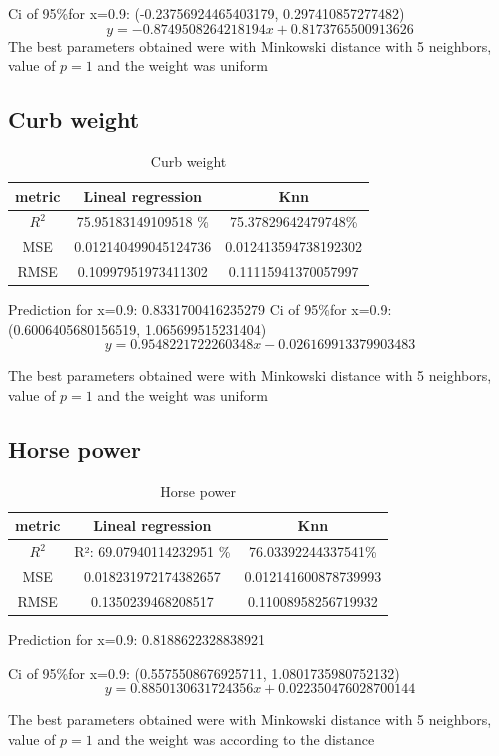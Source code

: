 \documentclass{article}
\begin{document}
Ci of  95\%for x=0.9: (-0.23756924465403179, 0.297410857277482)
$$y=-0.8749508264218194x+0.8173765500913626$$
The best parameters obtained were with Minkowski distance with 5 neighbors,  value of $p=1$ and the weight was uniform
\subsection{Curb weight}
\begin{table}[H]
\begin{tabular}{|c|c|c|}
  \hline
   metric & Lineal regression & Knn \\ \hline
   $R^2$& 75.95183149109518 \%&75.37829642479748\%\\
   MSE&  0.012140499045124736& 0.012413594738192302\\
   RMSE&0.10997951973411302
   &0.11115941370057997\\
   \hline
  \end{tabular}
  \caption{ Curb weight}
\end{table}
Prediction for x=0.9: 0.8331700416235279
Ci of  95\%for x=0.9: (0.6006405680156519, 1.065699515231404)
$$y=0.9548221722260348x -0.026169913379903483$$

The best parameters obtained were with Minkowski distance with 5 neighbors,  value of $p=1$ and the weight was uniform
\begin{table}[H]
\subsection{Horse power}
\begin{tabular}{|c|c|c|}
  \hline
   metric & Lineal regression & Knn \\ \hline
   $R^2$& R²: 69.07940114232951 \%&76.03392244337541\%\\
   MSE&  0.018231972174382657& 0.012141600878739993\\
   RMSE&0.1350239468208517& 0.11008958256719932\\
   \hline
  \end{tabular}
  \caption{ Horse power}
\end{table}
Prediction for x=0.9: 0.8188622328838921

Ci of  95\%for x=0.9: (0.5575508676925711, 1.0801735980752132)
$$y=0.8850130631724356x +0.022350476028700144$$

The best parameters obtained were with Minkowski distance with 5 neighbors,  value of $p=1$ and the weight was according to the distance
\end{document}
